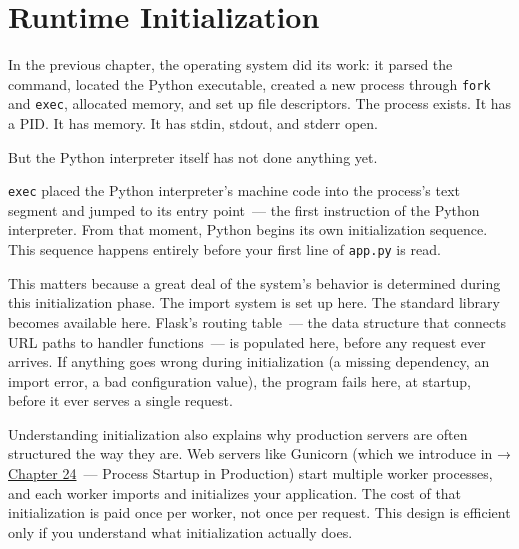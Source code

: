 \setcounter{chapter}{1}
\chapter{Runtime Initialization}\label{ch:02-runtime-initialization}


\chapterrule

In the previous chapter, the operating system did its work: it parsed the command, located the Python executable, created a new process through \texttt{fork} and \texttt{exec}, allocated memory, and set up file descriptors. The process exists. It has a PID. It has memory. It has stdin, stdout, and stderr open.

But the Python interpreter itself has not done anything yet.

\texttt{exec} placed the Python interpreter's machine code into the process's text segment and jumped to its entry point~--- the first instruction of the Python interpreter. From that moment, Python begins its own initialization sequence. This sequence happens entirely before your first line of \texttt{app.py} is read.

This matters because a great deal of the system's behavior is determined during this initialization phase. The import system is set up here. The standard library becomes available here. Flask's routing table~--- the data structure that connects URL paths to handler functions~--- is populated here, before any request ever arrives. If anything goes wrong during initialization (a missing dependency, an import error, a bad configuration value), the program fails here, at startup, before it ever serves a single request.

Understanding initialization also explains why production servers are often structured the way they are. Web servers like Gunicorn (which we introduce in → \hyperref[ch:24-process-startup]{Chapter 24}~--- Process Startup in Production) start multiple worker processes, and each worker imports and initializes your application. The cost of that initialization is paid once per worker, not once per request. This design is efficient only if you understand what initialization actually does.

